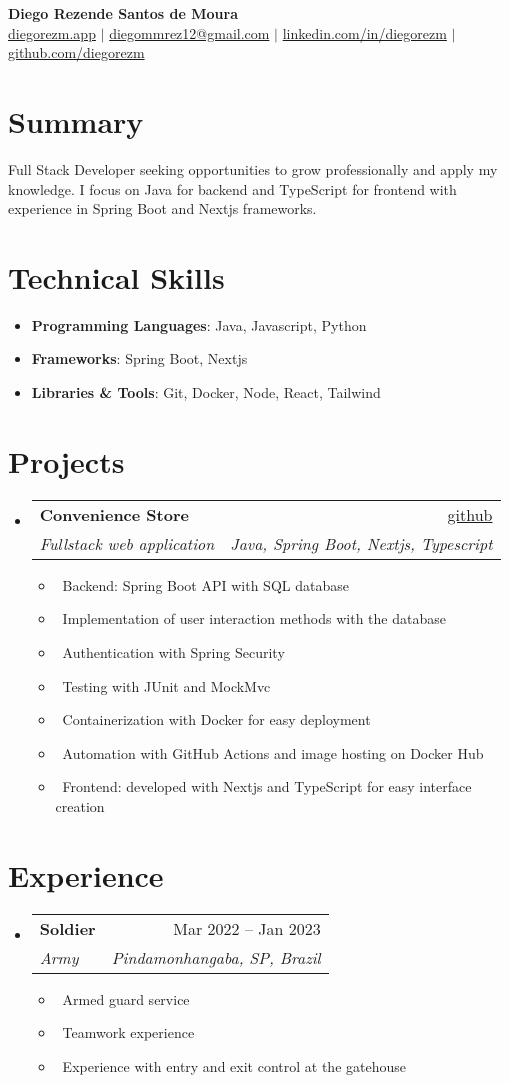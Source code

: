 \documentclass[letterpaper,10pt]{article}
\makeatletter
\newcommand{\resumeItem}[1]{\item\small{#1}}
\newcommand{\resumeSubheading}[4]{
\vspace{-1pt}\item
  \begin{tabular*}{0.97\textwidth}[t]{l@{\extracolsep{\fill}}r}
    \textbf{#1} & #2 \\
    \textit{#3} & \textit{#4} \\
  \end{tabular*}\vspace{-7pt}
}
\newcommand{\resumeSubHeadingList}{\begin{itemize}[leftmargin=0.15in, label={}]}
\newcommand{\resumeSubHeadingListEnd}{\end{itemize}}
\makeatother
\begin{document}
\begin{center}
  \textbf{\Huge Diego Rezende Santos de Moura} \\
  \small \href{https://diegorezm.netlify.app/}{diegorezm.app} $|$ \href{mailto:diegommrez12@gmail.com}{diegommrez12@gmail.com} $|$ 
  \href{https://linkedin.com/in/diegorezm}{linkedin.com/in/diegorezm} $|$
  \href{https://github.com/diegorezm}{github.com/diegorezm}
\end{center}

\section*{Summary}
Full Stack Developer seeking opportunities to grow professionally and apply my knowledge. I focus on Java for backend and TypeScript for frontend with experience in Spring Boot and Nextjs frameworks.

\section{Technical Skills}
\resumeSubHeadingList
  \resumeItem{\textbf{Programming Languages}: Java, Javascript, Python}
  \resumeItem{\textbf{Frameworks}: Spring Boot, Nextjs}
  \resumeItem{\textbf{Libraries \& Tools}: Git, Docker, Node, React, Tailwind}
\resumeSubHeadingListEnd

\section{Projects}
\resumeSubHeadingList
  \resumeSubheading
      {Convenience Store}{\href{https://github.com/diegorezm/convenience.store.api}{github}} 
      {Fullstack web application}{Java, Spring Boot, Nextjs, Typescript}
      \resumeSubHeadingList
          \resumeItem{\textbullet\ Backend: Spring Boot API with SQL database}
          \resumeItem{\textbullet\ Implementation of user interaction methods with the database}
          \resumeItem{\textbullet\ Authentication with Spring Security}
          \resumeItem{\textbullet\ Testing with JUnit and MockMvc}
          \resumeItem{\textbullet\ Containerization with Docker for easy deployment}
          \resumeItem{\textbullet\ Automation with GitHub Actions and image hosting on Docker Hub}
          \resumeItem{\textbullet\ Frontend: developed with Nextjs and TypeScript for easy interface creation}
      \resumeSubHeadingListEnd
\resumeSubHeadingListEnd

\section{Experience}
\resumeSubHeadingList
  \resumeSubheading
      {Soldier}{Mar 2022 -- Jan 2023}
      {Army}{Pindamonhangaba, SP, Brazil}
      \resumeSubHeadingList
          \resumeItem{\textbullet\ Armed guard service}
          \resumeItem{\textbullet\ Teamwork experience}
          \resumeItem{\textbullet\ Experience with entry and exit control at the gatehouse}
      \resumeSubHeadingListEnd
\resumeSubHeadingListEnd
\end{document}
